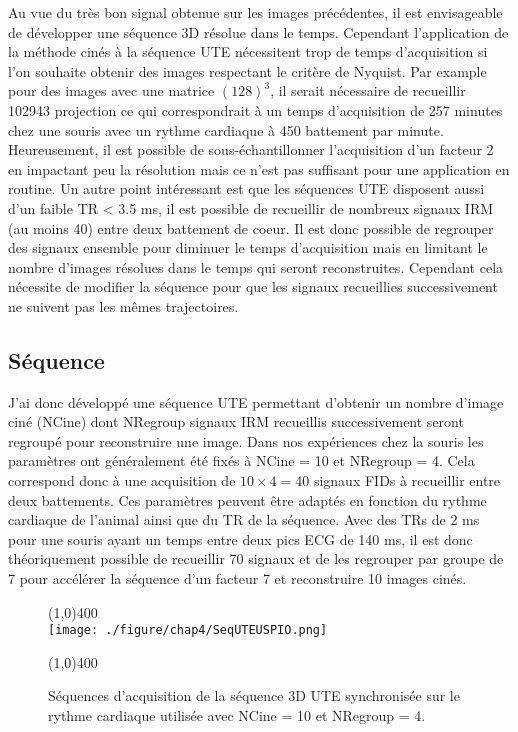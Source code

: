 Au vue du très bon signal obtenue sur les images précédentes, il est envisageable de développer une séquence 3D résolue dans le temps. Cependant l'application de la méthode cinés à la séquence UTE nécessitent trop de temps d'acquisition si l'on souhaite obtenir des images respectant le critère de Nyquist. Par example pour des images avec une matrice $(128)^3$, il serait nécessaire de recueillir 102943 projection ce qui correspondrait à un temps d'acquisition de 257 minutes chez une souris avec un rythme cardiaque à 450 battement par minute. Heureusement, il est possible de sous-échantillonner l'acquisition d'un facteur 2 en impactant peu la résolution mais ce n'est pas suffisant pour une application en routine. Un autre point intéressant est que les séquences UTE disposent aussi d'un faible TR < 3.5 ms, il est possible de recueillir de nombreux signaux IRM (au moins 40) entre deux battement de coeur. Il est donc possible de regrouper des signaux ensemble pour diminuer le temps d'acquisition mais en limitant le nombre d'images résolues dans le temps qui seront reconstruites. 
Cependant cela nécessite de modifier la séquence pour que les signaux recueillies successivement ne suivent pas les mêmes trajectoires.


\subsection{Séquence}

J'ai donc développé une séquence UTE permettant d'obtenir un nombre d'image ciné (NCine) dont NRegroup signaux IRM recueillis successivement seront regroupé pour reconstruire une image. Dans nos expériences chez la souris les paramètres ont généralement été fixés à NCine = 10 et NRegroup = 4. Cela correspond donc à une acquisition de $10 \times 4 = 40$ signaux FIDs à recueillir entre deux battements. Ces paramètres peuvent être adaptés en fonction du rythme cardiaque de l'animal ainsi que du TR de la séquence. Avec des TRs de 2 ms pour une souris ayant un temps entre deux pics ECG de 140 ms, il est donc théoriquement possible de recueillir 70 signaux et de les regrouper par groupe de 7 pour accélérer la séquence d'un facteur 7 et reconstruire 10 images cinés.

\begin{figure}[H]
\centering
\line(1,0){400} \\
\texttt{[image: ./figure/chap4/SeqUTEUSPIO.png]}
\caption[Séquence UTE USPIO]{\label{fig:SeqUTEUSPIO} Séquences d'acquisition de la séquence 3D UTE synchronisée sur le rythme cardiaque utilisée avec NCine = 10 et NRegroup = 4.}
\line(1,0){400} \\ 
\end{figure}

